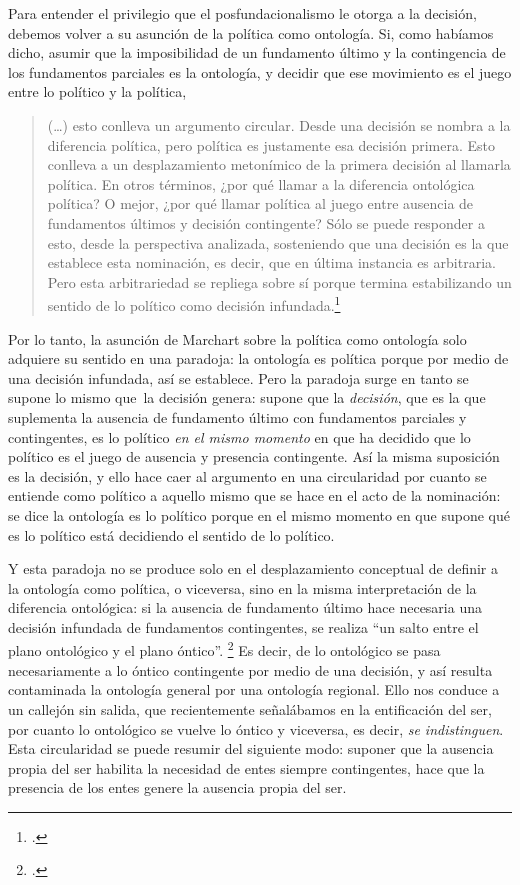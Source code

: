 Para entender el privilegio que el posfundacionalismo le otorga a la decisión, debemos volver a su asunción de la política como ontología. Si, como habíamos dicho, asumir que la imposibilidad de un fundamento último y la contingencia de los fundamentos parciales es la ontología, y decidir que ese movimiento es el juego entre lo político y la política,

\begin{quote}
(\ldots) esto conlleva un argumento circular. Desde una decisión se nombra a la diferencia política, pero política es justamente esa decisión primera. Esto conlleva a un desplazamiento metonímico de la primera decisión al llamarla política. En otros términos, ¿por qué llamar a la diferencia ontológica política? O mejor, ¿por qué llamar política al juego entre ausencia de fundamentos últimos y decisión contingente? Sólo se puede responder a esto, desde la perspectiva analizada, sosteniendo que una decisión es la que establece esta nominación, es decir, que en última instancia es arbitraria. Pero esta arbitrariedad se repliega sobre sí porque termina estabilizando un sentido de lo político como decisión infundada.\footcite[190]{@7074-BISET2010}
\end{quote}

Por lo tanto, la asunción de Marchart sobre la política como ontología solo adquiere su sentido en una paradoja: la ontología es política porque por medio de una decisión infundada, así se establece. Pero la paradoja surge en tanto se supone lo mismo que~la decisión genera: supone que la \emph{decisión}, que es la que suplementa la ausencia de fundamento último con fundamentos parciales y contingentes, es lo político \emph{en el mismo momento} en que ha decidido que lo político es el juego de ausencia y presencia contingente. Así la misma suposición es la decisión, y ello hace caer al argumento en una circularidad por cuanto se entiende como político a aquello mismo que se hace en el acto de la nominación: se dice la ontología es lo político porque en el mismo momento en que supone qué es lo político está decidiendo el sentido de lo político.

Y esta paradoja no se produce solo en el desplazamiento conceptual de definir a la ontología como política, o viceversa, sino en la misma interpretación de la diferencia ontológica: si la ausencia de fundamento último hace necesaria una decisión infundada de fundamentos contingentes, se realiza \enquote{un salto entre el plano ontológico y el plano óntico}. \footcite{@7074-BISET2010} Es decir, de lo ontológico se pasa necesariamente a lo óntico contingente por medio de una decisión, y así resulta contaminada la ontología general por una ontología regional. Ello nos conduce a un callejón sin salida, que recientemente señalábamos en la entificación del ser, por cuanto lo ontológico se vuelve lo óntico y viceversa, es decir, \emph{se indistinguen}. Esta circularidad se puede resumir del siguiente modo: suponer que la ausencia propia del ser habilita la necesidad de entes siempre contingentes, hace que la presencia de los entes genere la ausencia propia del ser.

